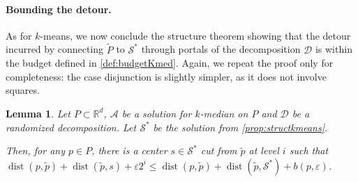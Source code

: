 \documentclass[11pt]{article}
\newtheorem{lemma}[theorem]{Lemma}
\newcommand{\R}{\mathbb R}
\newcommand{\eps}{\varepsilon}
\renewcommand{\tilde}{\widetilde}
\newcommand{\calD}{\mathcal {D}}
\newcommand{\calS}{\mathcal {S}}
\newcommand{\calL}{\mathcal{A}}
\DeclareMathOperator{\dist}{dist}
\begin{document}
\paragraph{Bounding the detour.}
As for $k$-means, we now conclude the structure theorem showing that the detour incurred by connecting $\tilde P$ to $\calS^*$ through portals of the decomposition $\calD$ is within the budget defined in \cref{def:budgetKmed}. Again, we repeat the proof only for completeness: the case disjunction is slightly simpler, as it does not involve squares.

\begin{lemma}
  \label{lem:detourkmedians}
Let $P \subset \R^d$, $\calL$ be a solution for $k$-median on $P$ and $\calD$ be a randomized decomposition. 
Let $\calS^*$ be the solution from \cref{prop:structkmeans}.

 Then, for any $p \in P$, there is a center $s \in \calS^*$ cut from $\tilde p$ at level $i$ such that $\dist(p, \tilde p) + \dist(\tilde p, s) + \eps 2^i \leq \dist(p, \tilde p) + \dist(\tilde p, \calS^*) + b(p, \eps)$.
 \end{lemma}
\end{document}
